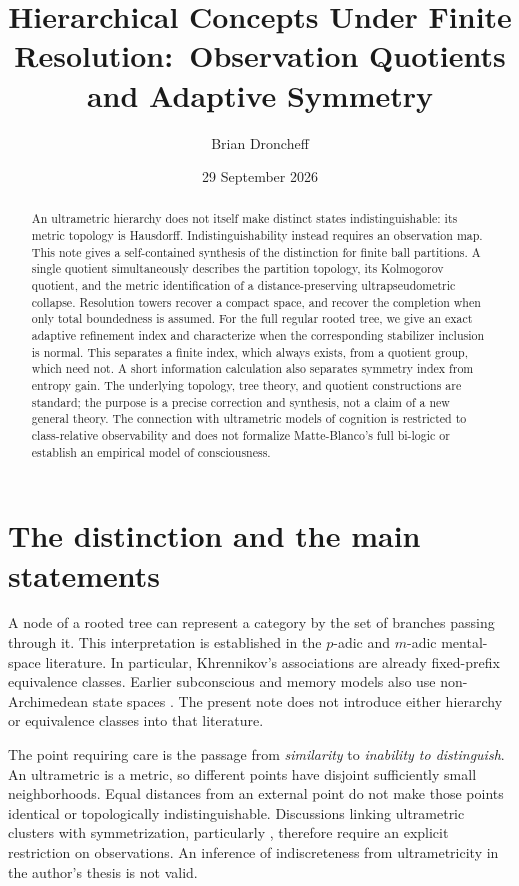 \documentclass[11pt]{article}
\title{Hierarchical Concepts Under Finite Resolution:\
Observation Quotients and Adaptive Symmetry}
\author{Brian Droncheff}
\date{29 September 2026}
\theoremstyle{definition}
\theoremstyle{remark}
\begin{document}
\maketitle
\begin{abstract}
An ultrametric hierarchy does not itself make distinct states indistinguishable: its metric topology is Hausdorff. Indistinguishability instead requires an observation map. This note gives a self-contained synthesis of the distinction for finite ball partitions. A single quotient simultaneously describes the partition topology, its Kolmogorov quotient, and the metric identification of a distance-preserving ultrapseudometric collapse. Resolution towers recover a compact space, and recover the completion when only total boundedness is assumed. For the full regular rooted tree, we give an exact adaptive refinement index and characterize when the corresponding stabilizer inclusion is normal. This separates a finite index, which always exists, from a quotient group, which need not. A short information calculation also separates symmetry index from entropy gain. The underlying topology, tree theory, and quotient constructions are standard; the purpose is a precise correction and synthesis, not a claim of a new general theory. The connection with ultrametric models of cognition is restricted to class-relative observability and does not formalize Matte-Blanco's full bi-logic or establish an empirical model of consciousness.
\end{abstract}

\section{The distinction and the main statements}
A node of a rooted tree can represent a category by the set of branches passing through it. This interpretation is established in the $p$-adic and $m$-adic mental-space literature. In particular, Khrennikov's \cite[Section 4]{Khrennikov2007} associations are already fixed-prefix equivalence classes. Earlier subconscious and memory models also use non-Archimedean state spaces \cite{Khrennikov1998,Albeverio1999}. The present note does not introduce either hierarchy or equivalence classes into that literature.

The point requiring care is the passage from \emph{similarity} to \emph{inability to distinguish}. An ultrametric is a metric, so different points have disjoint sufficiently small neighborhoods. Equal distances from an external point do not make those points identical or topologically indistinguishable. Discussions linking ultrametric clusters with symmetrization, particularly \cite[pp.~537--539]{LauroGrotto2008}, therefore require an explicit restriction on observations. An inference of indiscreteness from ultrametricity in the author's thesis \cite{Droncheff2015} is not valid.
\end{document}

